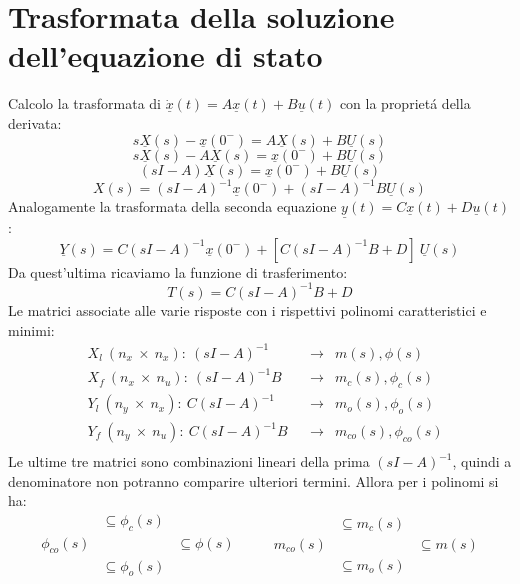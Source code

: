 \documentclass[../main.tex]{subfiles}
\begin{document}
	\section{Trasformata della soluzione dell'equazione di stato}
		Calcolo la trasformata di $ \dot{\underline x}(t) = A \underline x(t) + B \underline u(t) $ con la propriet\'a della derivata:
		\[ s \underline X(s) - \underline x(0^-) = A \underline X(s) + B \underline U(s) \]
		\[ s \underline X(s) - A \underline X(s) = \underline x(0^-) + B \underline U(s) \]
		\[ (sI - A) \underline X(s) = \underline x(0^-) + B \underline U(s) \]
		\begin{equation}
			X(s) = (sI-A)^{-1} \underline x(0^-) + (sI-A)^{-1} B \underline U(s)
		\end{equation}
		Analogamente la trasformata della seconda equazione $ \underline y(t) = C \underline x(t) + D \underline u(t) $:
		\begin{equation}
			\underline Y(s) = C (sI-A)^{-1} \underline x(0^-) + [C(sI-A)^{-1}B + D]\ \underline U(s)
		\end{equation}
		Da quest'ultima ricaviamo la funzione di trasferimento:
		\[ T(s) = C (sI-A)^{-1} B + D \]
		Le matrici associate alle varie risposte con i rispettivi polinomi caratteristici e minimi:
		\begin{align*}
			&X_l\ (n_x\ \times\ n_x):\ (sI-A)^{-1} &&\longrightarrow &m(s), \phi(s)\\
			&X_f\ (n_x\ \times\ n_u):\ (sI-A)^{-1}B &&\longrightarrow &m_c(s), \phi_c(s)\\
			&Y_l\ (n_y\ \times\ n_x):\ C(sI-A)^{-1} &&\longrightarrow &m_o(s), \phi_o(s)\\
			&Y_f\ (n_y\ \times\ n_u):\ C(sI-A)^{-1}B &&\longrightarrow &m_{co}(s), \phi_{co}(s)\\
		\end{align*}
		Le ultime tre matrici sono combinazioni lineari della prima $ (sI-A)^{-1} $, quindi a denominatore non potranno comparire ulteriori termini. Allora per i polinomi si ha:
		\[ \begin{array}{ccc}
						 &\subseteq \phi_c(s) &\\
			\phi_{co}(s) & 					  &\subseteq \phi(s)\\
						 &\subseteq \phi_o(s) &\\
		\end{array} \qquad
		\begin{array}{ccc}
					  &\subseteq m_c(s) &\\
			m_{co}(s) & 				&\subseteq m(s)\\
					  &\subseteq m_o(s) &\\
		\end{array} \]
		
\end{document}
